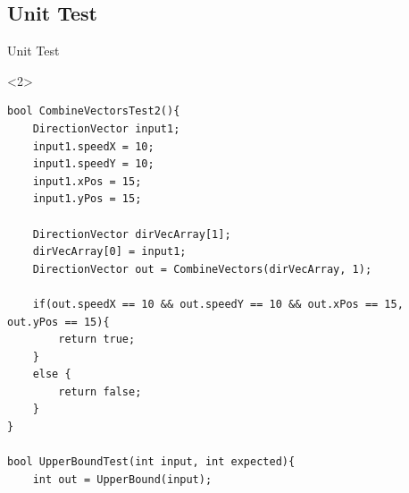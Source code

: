 \subsection{Unit Test}
\begin{frame}[fragile]{Unit Test}
\begin{itemize}
\end{itemize}
\begin{onlyenv}<2>
\begin{center}
\begin{minipage}[H]{0.9\linewidth}
\begin{lstlisting}
bool CombineVectorsTest2(){
	DirectionVector input1;
	input1.speedX = 10;
  	input1.speedY = 10;
  	input1.xPos = 15;
  	input1.yPos = 15;

  	DirectionVector dirVecArray[1];
  	dirVecArray[0] = input1;
  	DirectionVector out = CombineVectors(dirVecArray, 1);

  	if(out.speedX == 10 && out.speedY == 10 && out.xPos == 15, out.yPos == 15){
    	return true;
  	}
  	else {
    	return false;
  	}
}

bool UpperBoundTest(int input, int expected){
	int out = UpperBound(input);


\end{lstlisting}
\end{minipage}
\end{center}
\end{onlyenv}
\end{frame}
